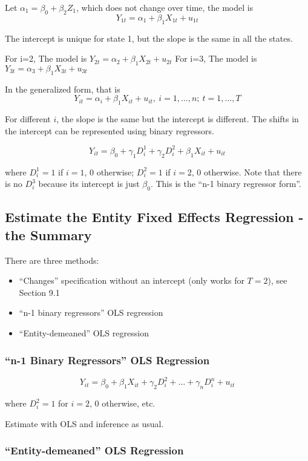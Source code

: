 \documentclass{article}
\begin{document}
Let $\alpha_1 = \beta_0 + \beta_2Z_1$, which does not change over time,
the model is
\[
	Y_{1t} = \alpha_1 + \beta_1 X_{1t} + u_{1t}
\]

The intercept is unique for state 1, but the slope is the same in all the states.

For i=2, The model is $Y_{2t} = \alpha_2 + \beta_1 X_{2t} + u_{2t}$
For i=3, The model is $Y_{3t} = \alpha_3 + \beta_1 X_{3t} + u_{3t}$

In the generalized form, that is
\[
	Y_{it} = \alpha_i + \beta_1X_{it} + u_{it},\ i=1,\ldots, n;\ t= 1, \ldots, T
\]

For different $i$, the slope is the same but the intercept is different.
The shifts in the intercept can be represented using binary regressors.

\[
	Y_{it} = \beta_0 + \gamma_1 D^1_i + \gamma_2 D^2_i + \beta_1 X_{it} + u_{it}
\]

where $D^1_i = 1$ if $i=1$, 0 otherwise; $D^2_i = 1$ if $i=2$, 0 otherwise.
Note that there is no $D^3_i$ because its intercept is just $\beta_0$.
This is the ``n-1 binary regressor form''.

\subsection{Estimate the Entity Fixed Effects Regression - the Summary}

There are three methods:
\begin{itemize}
	\item ``Changes'' specification without an intercept (only works for $T=2$), see Section 9.1
	\item ``n-1 binary regressors'' OLS regression
	\item ``Entity-demeaned'' OLS regression
\end{itemize}

\subsubsection{``n-1 Binary Regressors'' OLS Regression}

\[
	Y_{it} = \beta_0 + \beta_1 X_{it} + \gamma_2 D^2_i + \ldots + \gamma_n D^n_i + u_{it}
\]

where $D^2_i = 1$ for $i=2$, 0 otherwise, etc.

Estimate with OLS and inference as usual.

\subsubsection{``Entity-demeaned'' OLS Regression}
\end{document}
